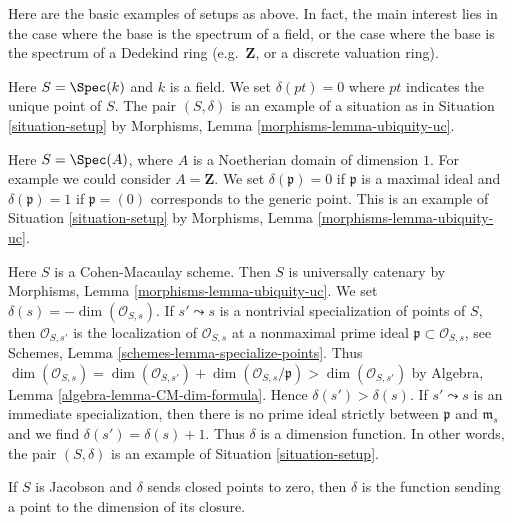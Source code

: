 \medskip\noindent
Here are the basic examples of setups as above.
In fact, the main interest lies in the case where the base
is the spectrum of a field, or the case where the base
is the spectrum of a Dedekind ring (e.g.\ $\mathbf{Z}$,
or a discrete valuation ring).

\begin{example}
\label{example-field}
Here $S = \Spec(k)$ and $k$ is a field.
We set $\delta(pt) = 0$ where $pt$ indicates the unique point of $S$.
The pair $(S, \delta)$ is an example of a situation as in
Situation \ref{situation-setup} by
Morphisms, Lemma \ref{morphisms-lemma-ubiquity-uc}.
\end{example}

\begin{example}
\label{example-domain-dimension-1}
Here $S = \Spec(A)$, where $A$ is a Noetherian domain
of dimension $1$.
For example we could consider $A = \mathbf{Z}$.
We set $\delta(\mathfrak p) = 0$ if
$\mathfrak p$ is a maximal ideal and $\delta(\mathfrak p) = 1$
if $\mathfrak p = (0)$ corresponds to the generic point.
This is an example of Situation \ref{situation-setup} by
Morphisms, Lemma \ref{morphisms-lemma-ubiquity-uc}.
\end{example}

\begin{example}
\label{example-CM-irreducible}
Here $S$ is a Cohen-Macaulay scheme. Then $S$ is universally catenary by
Morphisms, Lemma \ref{morphisms-lemma-ubiquity-uc}.
We set $\delta(s) = -\dim(\mathcal{O}_{S, s})$.
If $s' \leadsto s$ is a nontrivial specialization of points of $S$,
then $\mathcal{O}_{S, s'}$ is the localization of $\mathcal{O}_{S, s}$
at a nonmaximal prime ideal $\mathfrak p \subset \mathcal{O}_{S, s}$, see
Schemes, Lemma \ref{schemes-lemma-specialize-points}.
Thus $\dim(\mathcal{O}_{S, s}) =
\dim(\mathcal{O}_{S, s'}) + \dim(\mathcal{O}_{S, s}/\mathfrak p) >
\dim(\mathcal{O}_{S, s'})$ by
Algebra, Lemma \ref{algebra-lemma-CM-dim-formula}.
Hence $\delta(s') > \delta(s)$. If $s' \leadsto s$ is
an immediate specialization, then there is no prime
ideal strictly between $\mathfrak p$ and $\mathfrak m_s$
and we find $\delta(s') = \delta(s) + 1$. Thus $\delta$
is a dimension function. In other words, the pair $(S, \delta)$
is an example of Situation \ref{situation-setup}.
\end{example}

\noindent
If $S$ is Jacobson and $\delta$ sends closed points to zero, then $\delta$
is the function sending a point to the dimension of its closure.

